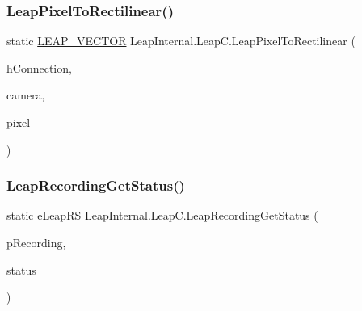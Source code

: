 \subsubsection{\texorpdfstring{LeapPixelToRectilinear()}{LeapPixelToRectilinear()}}
{\footnotesize\ttfamily static \mbox{\hyperlink{struct_leap_internal_1_1_l_e_a_p___v_e_c_t_o_r}{L\+E\+A\+P\+\_\+\+V\+E\+C\+T\+OR}} Leap\+Internal.\+Leap\+C.\+Leap\+Pixel\+To\+Rectilinear (\begin{DoxyParamCaption}\item[{Int\+Ptr}]{h\+Connection,  }\item[{\mbox{\hyperlink{namespace_leap_internal_af2a2bc35637b8a453ff772a09a0987a1}{e\+Leap\+Perspective\+Type}}}]{camera,  }\item[{\mbox{\hyperlink{struct_leap_internal_1_1_l_e_a_p___v_e_c_t_o_r}{L\+E\+A\+P\+\_\+\+V\+E\+C\+T\+OR}}}]{pixel }\end{DoxyParamCaption})}

\mbox{\label{class_leap_internal_1_1_leap_c_a6dd578229acf4c12f114e137f1cf3f10}} 
\subsubsection{\texorpdfstring{LeapRecordingGetStatus()}{LeapRecordingGetStatus()}}
{\footnotesize\ttfamily static \mbox{\hyperlink{namespace_leap_internal_ae50b07d24c508b84273392b6dcbea1d9}{e\+Leap\+RS}} Leap\+Internal.\+Leap\+C.\+Leap\+Recording\+Get\+Status (\begin{DoxyParamCaption}\item[{Int\+Ptr}]{p\+Recording,  }\item[{ref \mbox{\hyperlink{struct_leap_internal_1_1_leap_c_1_1_l_e_a_p___r_e_c_o_r_d_i_n_g___s_t_a_t_u_s}{L\+E\+A\+P\+\_\+\+R\+E\+C\+O\+R\+D\+I\+N\+G\+\_\+\+S\+T\+A\+T\+US}}}]{status }\end{DoxyParamCaption})}

\mbox{\label{class_leap_internal_1_1_leap_c_a5703368f930a99b4f05a475273eb90b9}} 

